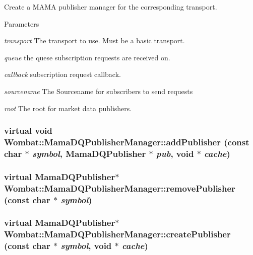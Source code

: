 Create a MAMA publisher manager for the corresponding transport. 
\begin{DoxyParams}{Parameters}
\item[{\em transport}]The transport to use. Must be a basic transport. \item[{\em queue}]the quese subscription requests are received on. \item[{\em callback}]subscription request callback. \item[{\em sourcename}]The Sourcename for subscribers to send requests \item[{\em root}]The root for market data publishers. \end{DoxyParams}
\hypertarget{classWombat_1_1MamaDQPublisherManager_aa31e692c0fba2a19eea1632d6f30f664}{
\subsubsection[{addPublisher}]{\setlength{\rightskip}{0pt plus 5cm}virtual void Wombat::MamaDQPublisherManager::addPublisher (const char $\ast$ {\em symbol}, \/  {\bf MamaDQPublisher} $\ast$ {\em pub}, \/  void $\ast$ {\em cache})}}
\label{classWombat_1_1MamaDQPublisherManager_aa31e692c0fba2a19eea1632d6f30f664}
\hypertarget{classWombat_1_1MamaDQPublisherManager_ade73b545253cfdf39cebc1ded7ea5a75}{
\subsubsection[{removePublisher}]{\setlength{\rightskip}{0pt plus 5cm}virtual {\bf MamaDQPublisher}$\ast$ Wombat::MamaDQPublisherManager::removePublisher (const char $\ast$ {\em symbol})}}
\label{classWombat_1_1MamaDQPublisherManager_ade73b545253cfdf39cebc1ded7ea5a75}
\hypertarget{classWombat_1_1MamaDQPublisherManager_a9ba42534979a3c0e7dce553e2933c2b8}{
\subsubsection[{createPublisher}]{\setlength{\rightskip}{0pt plus 5cm}virtual {\bf MamaDQPublisher}$\ast$ Wombat::MamaDQPublisherManager::createPublisher (const char $\ast$ {\em symbol}, \/  void $\ast$ {\em cache})}}
